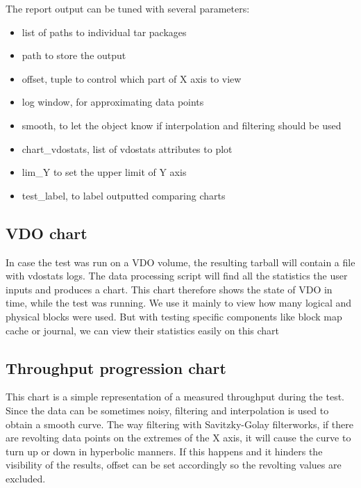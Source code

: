 \documentclass[
  color, %
  table, %
  lof,   %
  lot,   %
]{fithesis3}
\begin{document}
The report output can be tuned with several parameters:

\begin{itemize}
    \item list of paths to individual tar packages
    \item path to store the output
    \item offset, tuple to control which part of X axis to view
    \item log window, for approximating data points
    \item smooth, to let the object know if interpolation and filtering should be used
    \item chart\_vdostats, list of vdostats attributes to plot
    \item lim\_Y to set the upper limit of Y axis
    \item test\_label, to label outputted comparing charts
\end{itemize}





\subsection{VDO chart}
In case the test was run on a VDO volume, the resulting tarball will contain a file with vdostats logs. The data processing script will find all the statistics the user inputs and produces a chart. This chart therefore shows the state of VDO in time, while the test was running. We use it mainly to view how many logical and physical blocks were used. But with testing specific components like block map cache or journal, we can view their statistics easily on this chart

\subsection{Throughput progression chart}
This chart is a simple representation of a measured throughput during the test. Since the data can be sometimes noisy, filtering and interpolation is used to obtain a smooth curve. The way filtering with Savitzky-Golay filter\footnotemark[1] works, if there are revolting data points on the extremes of the X axis, it will cause the curve to turn up or down in hyperbolic manners. If this happens and it hinders the visibility of the results, offset can be set accordingly so the revolting values are excluded.
\end{document}
